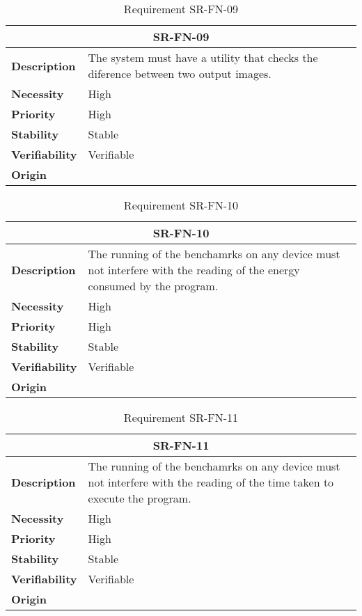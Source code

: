 \begin{table}[H]
    \centering
    \begin{tabular}{l p{10cm}}
        \toprule
        \multicolumn{2}{c}{SR-FN-09} \\
        \toprule
        \textbf{Description}        &  The system must have a utility that checks the diference between two output images. \\
        \textbf{Necessity}          &  High \\
        \textbf{Priority}           &  High \\
        \textbf{Stability}          &  Stable \\
        \textbf{Verifiability}      & Verifiable \\
        \textbf{Origin}             & \textit{\nameref{tab:ur-ca-04}} \\
    \end{tabular}
    \caption{Requirement SR-FN-09}
    \label{tab:sr-fn-09}
\end{table}


\begin{table}[H]
    \centering
    \begin{tabular}{l p{10cm}}
        \toprule
        \multicolumn{2}{c}{SR-FN-10} \\
        \toprule
        \textbf{Description}        &  The running of the benchamrks on any device must not interfere with the reading of the energy consumed by the program. \\
        \textbf{Necessity}          &  High \\
        \textbf{Priority}           &  High \\
        \textbf{Stability}          &  Stable \\
        \textbf{Verifiability}      & Verifiable \\
        \textbf{Origin}             & \textit{\nameref{tab:ur-ca-09}} \\
    \end{tabular}
    \caption{Requirement SR-FN-10}
    \label{tab:sr-fn-10}
\end{table}

\begin{table}[H]
    \centering
    \begin{tabular}{l p{10cm}}
        \toprule
        \multicolumn{2}{c}{SR-FN-11} \\
        \toprule
        \textbf{Description}        &  The running of the benchamrks on any device must not interfere with the reading of the time taken to execute the program. \\
        \textbf{Necessity}          &  High \\
        \textbf{Priority}           &  High \\
        \textbf{Stability}          &  Stable \\
        \textbf{Verifiability}      & Verifiable \\
        \textbf{Origin}             & \textit{\nameref{tab:ur-ca-09}} \\
    \end{tabular}
    \caption{Requirement SR-FN-11}
    \label{tab:sr-fn-11}
\end{table}

